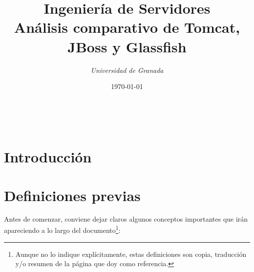\documentclass[a4paper, 10pt]{article}
\title{\textbf{Ingeniería de Servidores}\\ %
Análisis comparativo de Tomcat, JBoss y Glassfish} %
\author{ %
{\textit{Universidad de Granada}}} %
\date{\today} %
\makeatletter
\renewcommand{\maketitle}{
  \begin{flushright} %
  
  {\LARGE\@title} %
  
  \vspace{50pt} %
  
  {\large\@author} %
  \\\@date %
  \vspace{40pt} %
  \end{flushright}
}
\makeatother
\begin{document}
\maketitle %

\renewcommand{\abstractname}{Resumen} %
\begin{abstract}
 \end{abstract}





\section{Introducción}


\section{Definiciones previas}
	Antes de comenzar, conviene dejar claros algunos conceptos importantes que irán apareciendo
	a lo largo del documento\footnote{Aunque no lo indique explícitamente, estas definiciones
	son copia, traducción y/o resumen de la página que doy como referencia.}:
\end{document}

